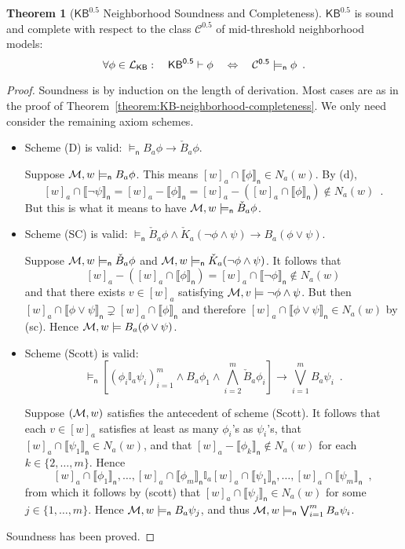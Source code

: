 \documentclass[12pt]{article}
\theoremstyle{definition}
\newtheorem{theorem}{Theorem}[section]
\newcommand{\M}{{\cal M}}      %
\newcommand{\Lang}{{\cal L}}   %
\newcommand{\KB}{{\mathsf{KB}}}                        %
\newcommand{\KBeq}{{\mathsf{KB}^{\mathsf{0.5}}}}       %
\newcommand{\Ceq}{{\mathcal{C}^{\mathsf{0.5}}}}    %
\newcommand{\modelsn}{\models_{\mathsf{n}}}                  %
\newcommand{\semn}[1]{\llbracket{#1}\rrbracket_{\mathsf{n}}} %
\begin{document}
\begin{theorem}[$\KBeq$ Neighborhood Soundness and Completeness]
  \label{theorem:KBeq}
  $\KBeq$ is sound and complete with respect to the class $\Ceq$ of
  mid-threshold neighborhood models:
  \[
  \forall\phi\in\Lang_\KB:\quad
  \KBeq\vdash\phi \quad\Leftrightarrow\quad \Ceq\modelsn\phi \enspace.
  \]
\end{theorem}
\begin{proof}
  Soundness is by induction on the length of derivation.  Most cases
  are as in the proof of
  Theorem~\ref{theorem:KB-neighborhood-completeness}.  We only need
  consider the remaining axiom schemes.
  \begin{itemize}
  \item Scheme (D) is valid: $\modelsn B_a\phi\to \check B_a\phi$.

    Suppose $\M,w\modelsn B_a\phi$. This means
    $[w]_a\cap\semn\phi\in N_a(w)$.  By (d), 
    \[
    [w]_a\cap\semn{\lnot\psi}=[w]_a-\semn\phi =
    [w]_a-([w]_a\cap\semn\phi)\notin N_a(w)\enspace.
    \]
    But this is what it means to have $\M,w\modelsn\check B_a\phi$.

  \item Scheme (SC) is valid: $\modelsn \check B_a\phi \land \check
    K_a(\lnot\phi\land\psi) \to B_a(\phi\lor\psi)$.

    Suppose $\M,w\modelsn\check B_a\phi$ and $\M,w\modelsn \check
    K_a(\lnot\phi\land\psi)$.  It follows that
    \[
    [w]_a-([w]_a\cap\semn{\phi})=[w]_a\cap\semn{\lnot\phi}\notin
    N_a(w)
    \]
    and that there exists $v\in[w]_a$ satisfying
    $\M,v\models\lnot\phi\land\psi$.  But then
    $[w]_a\cap\semn{\phi\lor\psi}\supsetneq[w]_a\cap\semn{\phi}$ and
    therefore $[w]_a\cap\semn{\phi\lor\psi}\in N_a(w)$ by (sc). Hence
    $\M,w\models B_a(\phi\lor\psi)$.

  \item Scheme (Scott) is valid:
    \[
    \modelsn \textstyle [(\phi_i\mathbb{I}_a\psi_i)_{i=1}^m
    \land B_a\phi_1 \land \bigwedge_{i=2}^m \check B_a\phi_i] \to
    \bigvee_{i=1}^m B_a\psi_i\enspace.
    \]

    Suppose $(\M,w)$ satisfies the antecedent of scheme (Scott).  It
    follows that each $v\in[w]_a$ satisfies at least as many
    $\phi_i$'s as $\psi_i$'s, that $[w]_a\cap\semn{\psi_1}\in N_a(w)$,
    and that $[w]_a-\semn{\phi_k}\notin N_a(w)$ for each
    $k\in\{2,\dots,m\}$.  Hence
    \[
    [w]_a\cap\semn{\phi_1},\dots,[w]_a\cap\semn{\phi_m}\mathbb{I}_a
    [w]_a\cap\semn{\psi_1},\dots, [w]_a\cap\semn{\psi_m}\enspace,
    \]
    from which it follows by (scott) that $[w]_a\cap\semn{\psi_j}\in
    N_a(w)$ for some $j\in\{1,\dots,m\}$.  Hence $\M,w\modelsn
    B_a\psi_j$, and thus $\M,w\modelsn\bigvee_{i=1}^m B_a\psi_i$.
  \end{itemize}
  Soundness has been proved.  


\end{proof}
\end{document}
